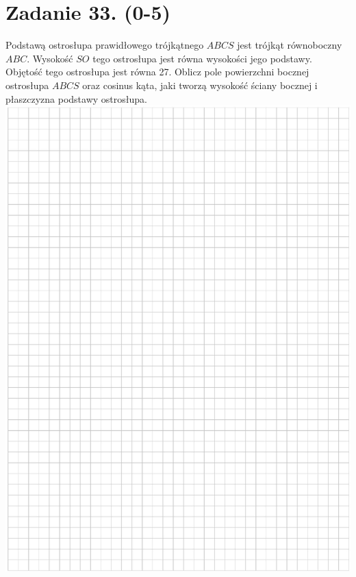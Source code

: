 \documentclass[10pt]{article}
\begin{document}
\section*{Zadanie 33. (0-5)}
Podstawą ostrosłupa prawidłowego trójkątnego \(A B C S\) jest trójkąt równoboczny \(A B C\). Wysokość \(S O\) tego ostrosłupa jest równa wysokości jego podstawy. Objętość tego ostrosłupa jest równa 27. Oblicz pole powierzchni bocznej ostrosłupa \(A B C S\) oraz cosinus kąta, jaki tworzą wysokość ściany bocznej i płaszczyzna podstawy ostrosłupa.\\
\includegraphics[max width=\textwidth, center]{2024_11_21_1c92fcc0db78c9202015g-20}\\
\end{document}

